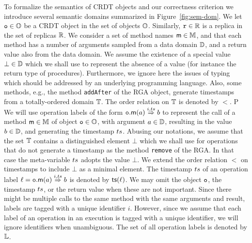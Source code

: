 To formalize the semantics of CRDT objects and our correctness
criterion we introduce several semantic domains summarized
in Figure~\ref{fig:sem-dom}.
%
We let $\mathtt{o} \in \mathbb{O}$ be a CRDT object in the set of objects
$\mathbb{O}$.
Similarly, $\mathtt{r} \in \mathbb{R}$ is a replica in the set of replicas
$\mathbb{R}$.
%
We consider a set of method names $\mathsf{m} \in \mathbb{M}$, and that
each method has a number of arguments sampled from a data domain
$\mathbb{D}$, and a return value also from the data domain.
%
We assume the existence of a special value $\bot \in \mathbb{D}$
which we shall use to represent the absence of a value (for instance
the return type of procedures).
%
%
Furthermore, we ignore here the issues of typing which should be
addressed by an underlying programming language.
Also, some methods, e.g., the method {\tt addAfter} of the RGA object, generate timestamps from a
totally-ordered domain $\mathbb{T}$. The order relation on $\mathbb{T}$ is denoted by $<$.
P
We will use operation labels of the form
${{\mathtt{o}.\mathsf{m}}}(a) \overset{i,ts}{\Rightarrow} b$ to represent the call of a
method $\mathsf{m} \in \mathbb{M}$ of object $\mathtt{o}\in \mathbb{O}$, with
argument $a \in \mathbb{D}$, resulting in the value $b \in
\mathbb{D}$, and generating the timestamp $ts$.
Abusing our notations, we assume that the set $\mathbb{T}$
contains a distinguished element $\bot$ which we shall use for
operations that do not generate a timestamp as the method {\tt remove}
of the RGA.
In that case the meta-variable $ts$ adopts the value $\bot$. We extend the order
relation $<$ on timestamps to include $\bot$ as a minimal element.
The timestamp $ts$ of an operation label $\ell={{\mathtt{o}.\mathsf{m}}}(a) \overset{i,ts}{\Rightarrow} b$
is denoted by $\mathsf{ts}(\ell)$.
We may omit the object $\mathtt{o}$, the timestamp $ts$, or the return
value when these are not important.
Since there might be multiple calls to the same method with the same
arguments and result, labels are tagged with a unique identifier $i$.
However, since we assume that each label of an operation in an
execution is tagged with a unique identifier, we will ignore
identifiers when unambiguous.
The set of all operation labels is denoted by $\mathbb{L}$.
%


